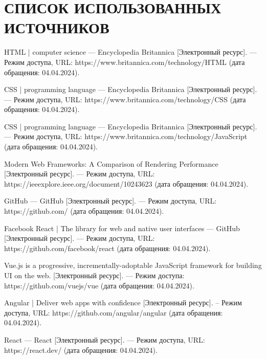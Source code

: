 \section*{СПИСОК ИСПОЛЬЗОВАННЫХ ИСТОЧНИКОВ}

\begingroup
\renewcommand{\section}[2]{}
\begin{thebibliography}{}
	
	HTML | computer science --- Encyclopedia Britannica [Электронный ресурс]. --- Режим доступа, URL: https://www.britannica.com/technology/HTML (дата обращения: 04.04.2024).
	
	CSS | programming language --- Encyclopedia Britannica [Электронный ресурс]. --- Режим доступа, URL: https://www.britannica.com/technology/CSS (дата обращения: 04.04.2024).
	
	CSS | programming language --- Encyclopedia Britannica [Электронный ресурс]. --- Режим доступа, URL: https://www.britannica.com/technology/JavaScript (дата обращения: 04.04.2024).
	
	Modern Web Frameworks: A Comparison of Rendering Performance [Электронный ресурс]. --- Режим доступа, URL: https://ieeexplore.ieee.org/document/10243623 (дата обращения: 04.04.2024).
	
	GitHub --- GitHub [Электронный ресурс]. --- Режим доступа, URL: https://github.com/ (дата обращения: 04.04.2024).
	
	Facebook React | The library for web and native user interfaces --- GitHub [Электронный ресурс]. --- Режим доступа, URL: https://github.com/facebook/react (дата обращения: 04.04.2024).
	
	Vue.js is a progressive, incrementally-adoptable JavaScript framework for building UI on the web. [Электронный ресурс]. --- Режим доступа: https://github.com/vuejs/vue (дата обращения: 04.04.2024).
		
	Angular | Deliver web apps with confidence [Электронный ресурс]. – Режим доступа, URL: https://github.com/angular/angular (дата обращения: 04.04.2024).
	
	React --- React [Электронный ресурс]. --- Режим доступа, URL:  https://react.dev/ (дата обращения: 04.04.2024).
	

\end{thebibliography}
